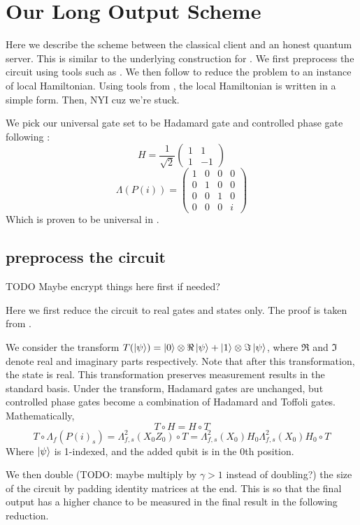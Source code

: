 \section{Our Long Output Scheme}

Here we describe the scheme between the classical client and an honest quantum server. This is similar to the underlying construction for \cite{mahadev_delegation}. We first preprocess the circuit using tools such as \cite{quant-ph/0301040}. We then follow \cite{kitaev2002classical} to reduce the problem to an instance of local Hamiltonian. Using tools from \cite{PhysRevA.93.022326}, the local Hamiltonian is written in a simple form. Then, NYI cuz we're stuck.

We pick our universal gate set to be Hadamard gate and controlled phase gate following \cite{quant-ph/0301040}:
$$H=\frac{1}{\sqrt{2}}\begin{pmatrix}1&1\\1&-1\end{pmatrix}$$
$$\Lambda(P(i))=\begin{pmatrix}1&0&0&0\\0&1&0&0\\0&0&1&0\\0&0&0&i\end{pmatrix}$$
Which is proven to be universal in \cite{kitaev_1997}.

\subsection{preprocess the circuit}

TODO Maybe encrypt things here first if needed?

Here we first reduce the circuit to real gates and states only. The proof is taken from \cite{quant-ph/0301040}.

We consider the transform $T(\ket{\psi})=\ket{0}\otimes\Re\ket{\psi}+\ket{1}\otimes\Im\ket{\psi}$, where $\Re$ and $\Im$ denote real and imaginary parts respectively. Note that after this transformation, the state is real. This transformation preserves measurement results in the standard basis. Under the transform, Hadamard gates are unchanged, but controlled phase gates become a combination of Hadamard and Toffoli gates. Mathematically,
$$T\circ H=H\circ T$$
$$T\circ\Lambda_f(P(i)_s)=\Lambda^2_{f,s}(X_0Z_0)\circ T=\Lambda^2_{f,s}(X_0)H_0\Lambda^2_{f,s}(X_0)H_0\circ T$$
Where $\ket{\psi}$ is 1-indexed, and the added qubit is in the 0th position. 

We then double (TODO: maybe multiply by $\gamma>1$ instead of doubling?) the size of the circuit by padding identity matrices at the end. This is so that the final output has a higher chance to be measured in the final result in the following reduction.


